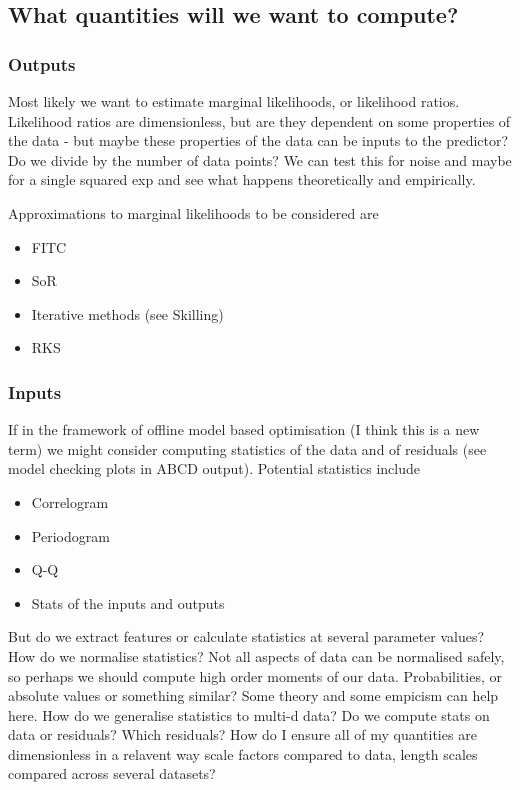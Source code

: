 \documentclass[twoside,11pt]{article}
\begin{document}
\subsection{What quantities will we want to compute?}

\subsubsection{Outputs}

Most likely we want to estimate marginal likelihoods, or likelihood ratios.
Likelihood ratios are dimensionless, but are they dependent on some properties of the data - but maybe these properties of the data can be inputs to the predictor?
Do we divide by the number of data points?
We can test this for \iid noise and maybe for a single squared exp and see what happens theoretically and empirically.

Approximations to marginal likelihoods to be considered are
\begin{itemize}
  \item FITC
  \item SoR
  \item Iterative methods (see \eg Skilling)
  \item RKS
\end{itemize}

\subsubsection{Inputs}

If in the framework of offline model based optimisation (I think this is a new term) we might consider computing statistics of the data and of residuals (see model checking plots in ABCD output).
Potential statistics include
\begin{itemize}
  \item Correlogram
  \item Periodogram
  \item Q-Q
  \item Stats of the inputs and outputs
\end{itemize}
But do we extract features or calculate statistics at several parameter values?
How do we normalise statistics?
Not all aspects of data can be normalised safely, so perhaps we should compute high order moments of our data.
Probabilities, or absolute values or something similar?
Some theory and some empicism can help here.
How do we generalise statistics to multi-d data?
Do we compute stats on data or residuals?
Which residuals?
How do I ensure all of my quantities are dimensionless in a relavent way \eg scale factors compared to data, length scales compared across several datasets?
\end{document}

